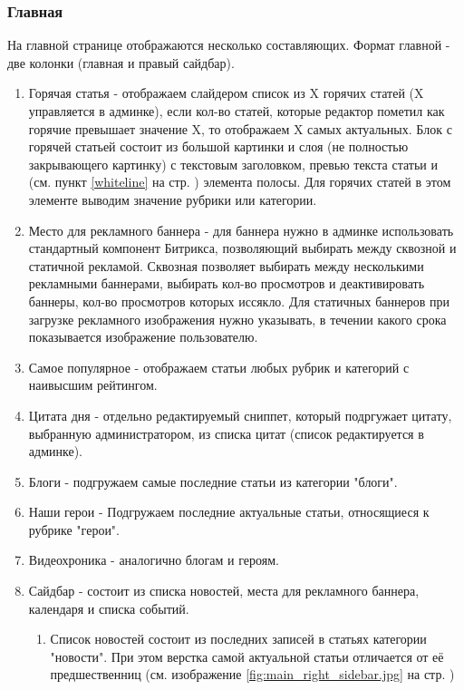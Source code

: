 \documentclass[DIV=calc, paper=a4, fontsize=11pt]{scrartcl} %
\begin{document}
\subsubsection{Главная}
На главной странице отображаются несколько составляющих. Формат главной - две колонки (главная и правый сайдбар).

\begin{enumerate}
    \item Горячая статья - отображаем слайдером список из X горячих статей (X управляется в админке), если кол-во статей, которые редактор пометил как горячие превышает значение X, то отображаем X самых актуальных. Блок с горячей статьей состоит из большой картинки и слоя (не полностью закрывающего картинку) с текстовым заголовком, превью текста статьи и (см. пункт \ref{whiteline} на стр. \pageref{whiteline} ) элемента полосы. Для горячих статей в этом элементе выводим значение рубрики или категории.
    \item Место для рекламного баннера - для баннера нужно в админке использовать стандартный компонент Битрикса, позволяющий выбирать между сквозной и статичной рекламой. Сквозная позволяет выбирать между несколькими рекламными баннерами, выбирать кол-во просмотров и деактивировать баннеры, кол-во просмотров которых иссякло. Для статичных баннеров при загрузке рекламного изображения нужно указывать, в течении какого срока показывается изображение пользователю.
    \item \label{subsec:mostpopular}Самое популярное - отображаем статьи любых рубрик и категорий с наивысшим рейтингом.
    \item Цитата дня - отдельно редактируемый сниппет, который подргужает цитату, выбранную администратором, из списка цитат (список редактируется в админке).
    \item Блоги - подгружаем самые последние статьи из категории "блоги".
    \item Наши герои - Подгружаем последние актуальные статьи, относящиеся к рубрике "герои".
    \item Видеохроника - аналогично блогам и героям.
    \item Сайдбар - состоит из списка новостей, места для рекламного баннера, календаря и списка событий.
        \begin{enumerate}
            \item Список новостей состоит из последних записей в статьях категории "новости". При этом верстка самой актуальной статьи отличается от её предшественниц (см. изображение \ref{fig:main_right_sidebar.jpg} на стр. \pageref{fig:main_right_sidebar.jpg})

\end{enumerate}
\end{enumerate}
\end{document}
